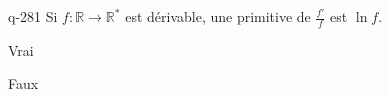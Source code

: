 \begin{truefalse}{q-281}
Si $f : \mathbb R \to \mathbb R^*$ est dérivable, une primitive de $\frac{f'}{f}$ est $\ln f$.
\item Vrai
\item* Faux
\end{truefalse}

